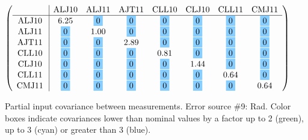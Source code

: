 \begin{table}[H]
\scriptsize
\begin{center}
\renewcommand{\arraystretch}{1.1}
\begin{math}\left(\begin{array}{c|ccccccc}
 & \mathrm{ALJ10} & 
\mathrm{ALJ11} & 
\mathrm{AJT11} & 
\mathrm{CLL10} & 
\mathrm{CLJ10} & 
\mathrm{CLL11} & 
\mathrm{CMJ11} \\
\hline
\mathrm{ALJ10} \hspace*{2pt} &       6.25 &  \colorbox{SkyBlue1}{$ 0$} &  \colorbox{SkyBlue1}{$ 0$} &  \colorbox{SkyBlue1}{$ 0$} &  \colorbox{SkyBlue1}{$ 0$} &  \colorbox{SkyBlue1}{$ 0$} &  \colorbox{SkyBlue1}{$ 0$} \\
\mathrm{ALJ11} \hspace*{2pt} &  \colorbox{SkyBlue1}{$ 0$} &       1.00 &  \colorbox{SkyBlue1}{$ 0$} &  \colorbox{SkyBlue1}{$ 0$} &  \colorbox{SkyBlue1}{$ 0$} &  \colorbox{SkyBlue1}{$ 0$} &  \colorbox{SkyBlue1}{$ 0$} \\
\mathrm{AJT11} \hspace*{2pt} &  \colorbox{SkyBlue1}{$ 0$} &  \colorbox{SkyBlue1}{$ 0$} &       2.89 &  \colorbox{SkyBlue1}{$ 0$} &  \colorbox{SkyBlue1}{$ 0$} &  \colorbox{SkyBlue1}{$ 0$} &  \colorbox{SkyBlue1}{$ 0$} \\
\mathrm{CLL10} \hspace*{2pt} &  \colorbox{SkyBlue1}{$ 0$} &  \colorbox{SkyBlue1}{$ 0$} &  \colorbox{SkyBlue1}{$ 0$} &       0.81 &  \colorbox{SkyBlue1}{$ 0$} &  \colorbox{SkyBlue1}{$ 0$} &  \colorbox{SkyBlue1}{$ 0$} \\
\mathrm{CLJ10} \hspace*{2pt} &  \colorbox{SkyBlue1}{$ 0$} &  \colorbox{SkyBlue1}{$ 0$} &  \colorbox{SkyBlue1}{$ 0$} &  \colorbox{SkyBlue1}{$ 0$} &       1.44 &  \colorbox{SkyBlue1}{$ 0$} &  \colorbox{SkyBlue1}{$ 0$} \\
\mathrm{CLL11} \hspace*{2pt} &  \colorbox{SkyBlue1}{$ 0$} &  \colorbox{SkyBlue1}{$ 0$} &  \colorbox{SkyBlue1}{$ 0$} &  \colorbox{SkyBlue1}{$ 0$} &  \colorbox{SkyBlue1}{$ 0$} &       0.64 &  \colorbox{SkyBlue1}{$ 0$} \\
\mathrm{CMJ11} \hspace*{2pt} &  \colorbox{SkyBlue1}{$ 0$} &  \colorbox{SkyBlue1}{$ 0$} &  \colorbox{SkyBlue1}{$ 0$} &  \colorbox{SkyBlue1}{$ 0$} &  \colorbox{SkyBlue1}{$ 0$} &  \colorbox{SkyBlue1}{$ 0$} &       0.64 \\
\end{array}\right)\end{math}
\caption{Partial input covariance between measurements. Error source \#9: Rad. Color boxes indicate covariances lower than nominal values by a factor up to 2 (green), up to 3 (cyan) or greater than 3 (blue).}
\renewcommand{\arraystretch}{1}
\end{center}
\end{table}
